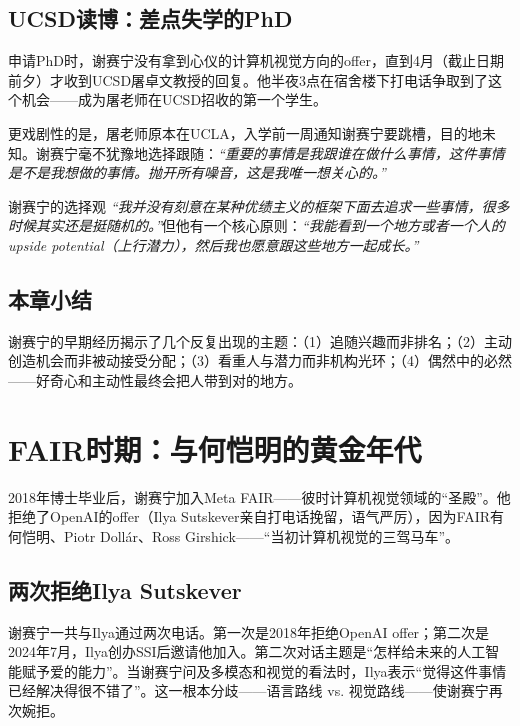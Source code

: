 \documentclass[a4paper]{article}
\begin{document}
\subsection{UCSD读博：差点失学的PhD}

申请PhD时，谢赛宁没有拿到心仪的计算机视觉方向的offer，直到4月（截止日期前夕）才收到UCSD屠卓文教授的回复。他半夜3点在宿舍楼下打电话争取到了这个机会——成为屠老师在UCSD招收的第一个学生。

更戏剧性的是，屠老师原本在UCLA，入学前一周通知谢赛宁要跳槽，目的地未知。谢赛宁毫不犹豫地选择跟随：\textit{``重要的事情是我跟谁在做什么事情，这件事情是不是我想做的事情。抛开所有噪音，这是我唯一想关心的。''}

\begin{importantbox}{谢赛宁的选择观}
\textit{``我并没有刻意在某种优绩主义的框架下面去追求一些事情，很多时候其实还是挺随机的。''}但他有一个核心原则：\textit{``我能看到一个地方或者一个人的upside potential（上行潜力），然后我也愿意跟这些地方一起成长。''}
\end{importantbox}

\subsection{本章小结}

谢赛宁的早期经历揭示了几个反复出现的主题：（1）追随兴趣而非排名；（2）主动创造机会而非被动接受分配；（3）看重人与潜力而非机构光环；（4）偶然中的必然——好奇心和主动性最终会把人带到对的地方。

\section{FAIR时期：与何恺明的黄金年代}

2018年博士毕业后，谢赛宁加入Meta FAIR——彼时计算机视觉领域的``圣殿''。他拒绝了OpenAI的offer（Ilya Sutskever亲自打电话挽留，语气严厉），因为FAIR有何恺明、Piotr Doll{\'a}r、Ross Girshick——``当初计算机视觉的三驾马车''。

\subsection{两次拒绝Ilya Sutskever}

谢赛宁一共与Ilya通过两次电话。第一次是2018年拒绝OpenAI offer；第二次是2024年7月，Ilya创办SSI后邀请他加入。第二次对话主题是``怎样给未来的人工智能赋予爱的能力''。当谢赛宁问及多模态和视觉的看法时，Ilya表示``觉得这件事情已经解决得很不错了''。这一根本分歧——语言路线 vs. 视觉路线——使谢赛宁再次婉拒。
\end{document}
